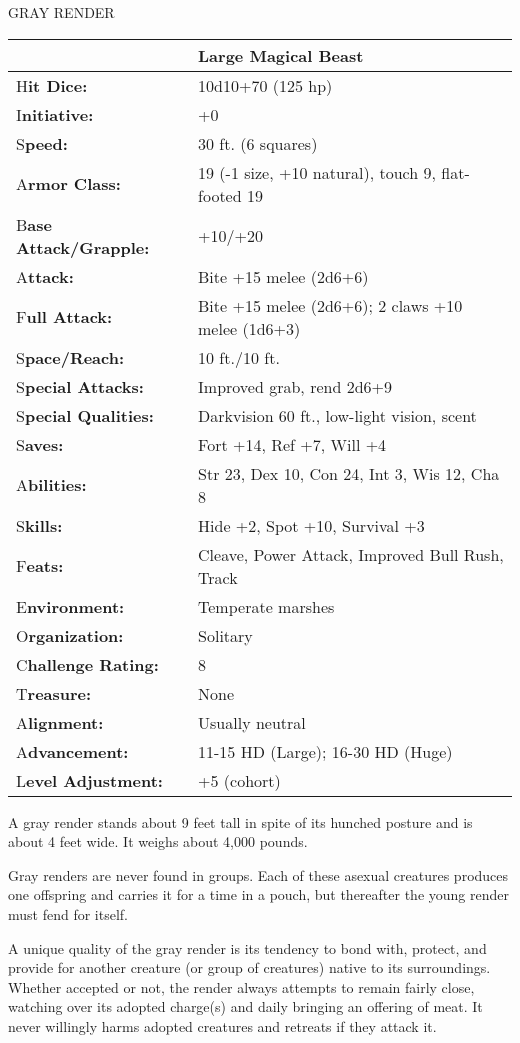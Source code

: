 \documentclass{article}
\begin{document}
\vspace{12pt}
{\LARGE{}GRAY RENDER}

\begin{tabular}{|>{\raggedright}p{91pt}|>{\raggedright}p{209pt}|}
\hline
  & Large Magical Beast\tabularnewline
\hline
H\textbf{it Dice:} & 10d10+70 (125 hp)\tabularnewline
\hline
I\textbf{nitiative:} & +0\tabularnewline
\hline
S\textbf{peed:} & 30 ft. (6 squares)\tabularnewline
\hline
A\textbf{rmor Class:} & 19 (-1 size, +10 natural), touch 9, flat-footed 19\tabularnewline
\hline
B\textbf{ase Attack/Grapple:} & +10/+20\tabularnewline
\hline
A\textbf{ttack:} & Bite +15 melee (2d6+6)\tabularnewline
\hline
F\textbf{ull Attack:} & Bite +15 melee (2d6+6); 2 claws +10 melee (1d6+3)\tabularnewline
\hline
S\textbf{pace/Reach:} & 10 ft./10 ft.\tabularnewline
\hline
S\textbf{pecial Attacks:} & Improved grab, rend 2d6+9\tabularnewline
\hline
S\textbf{pecial Qualities:} & Darkvision 60 ft., low-light vision, scent\tabularnewline
\hline
S\textbf{aves:} & Fort +14, Ref +7, Will +4\tabularnewline
\hline
A\textbf{bilities:} & Str 23, Dex 10, Con 24, Int 3, Wis 12, Cha 8\tabularnewline
\hline
S\textbf{kills:} & Hide +2, Spot +10, Survival +3\tabularnewline
\hline
F\textbf{eats:} & Cleave, Power Attack, Improved Bull Rush, Track\tabularnewline
\hline
E\textbf{nvironment:} & Temperate marshes\tabularnewline
\hline
O\textbf{rganization:} & Solitary\tabularnewline
\hline
C\textbf{hallenge Rating:} & 8\tabularnewline
\hline
T\textbf{reasure:} & None\tabularnewline
\hline
A\textbf{lignment:} & Usually neutral\tabularnewline
\hline
A\textbf{dvancement:} & 11-15 HD (Large); 16-30 HD (Huge)\tabularnewline
\hline
L\textbf{evel Adjustment:} & +5 (cohort)\tabularnewline
\hline
\end{tabular}

A gray render stands about 9 feet tall in spite of its hunched posture and is about 
4 feet wide. It weighs about 4,000 pounds. 

Gray renders are never found in groups. Each of these asexual creatures produces 
one offspring and carries it for a time in a pouch, but thereafter the young render 
must fend for itself.

A unique quality of the gray render is its tendency to bond with, protect, and 
provide for another creature (or group of creatures) native to its surroundings. 
Whether accepted or not, the render always attempts to remain fairly close, watching 
over its adopted charge(s) and daily bringing an offering of meat. It never willingly 
harms adopted creatures and retreats if they attack it.
\end{document}
